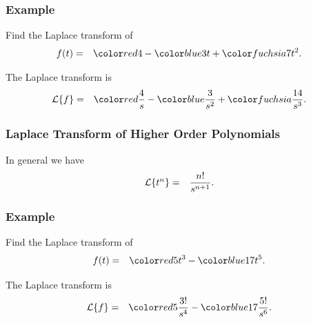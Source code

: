 \begin{frame}
  \frametitle{Example}

  Find the Laplace transform of 
  \begin{eqnarray*}
    f(t) & = & \redText{4} - \blueText{3t} + \fuchsiaText{7t^2}.
  \end{eqnarray*}

  {

    The Laplace transform is
    \begin{eqnarray*}
      \laplace{f} & = & \redText{\frac{4}{s}} - \blueText{\frac{3}{s^2}} + \fuchsiaText{\frac{14}{s^3}}.
    \end{eqnarray*}

  }

\end{frame}


\begin{frame}
  \frametitle{Laplace Transform of Higher Order Polynomials}

  In general we have
  \begin{eqnarray*}
    \laplace{t^n} & = & \frac{n!}{s^{n+1}}.
  \end{eqnarray*}

\end{frame}


\begin{frame}
  \frametitle{Example}

  Find the Laplace transform of 
  \begin{eqnarray*}
    f(t) & = & \redText{5 t^3} - \blueText{17 t^5}.
  \end{eqnarray*}

  {

    The Laplace transform is
    \begin{eqnarray*}
      \laplace{f} & = & \redText{5 \frac{3!}{s^4}} - \blueText{17 \frac{5!}{s^6}}.
    \end{eqnarray*}

  }

\end{frame}


